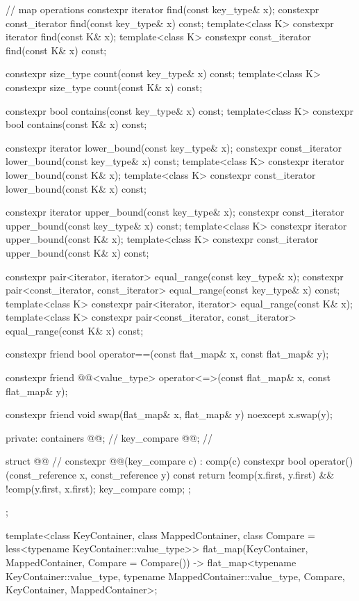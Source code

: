 \begin{codeblock}
{{    // map operations
    constexpr iterator find(const key_type& x);
    constexpr const_iterator find(const key_type& x) const;
    template<class K> constexpr iterator find(const K& x);
    template<class K> constexpr const_iterator find(const K& x) const;

    constexpr size_type count(const key_type& x) const;
    template<class K> constexpr size_type count(const K& x) const;

    constexpr bool contains(const key_type& x) const;
    template<class K> constexpr bool contains(const K& x) const;

    constexpr iterator lower_bound(const key_type& x);
    constexpr const_iterator lower_bound(const key_type& x) const;
    template<class K> constexpr iterator lower_bound(const K& x);
    template<class K> constexpr const_iterator lower_bound(const K& x) const;

    constexpr iterator upper_bound(const key_type& x);
    constexpr const_iterator upper_bound(const key_type& x) const;
    template<class K> constexpr iterator upper_bound(const K& x);
    template<class K> constexpr const_iterator upper_bound(const K& x) const;

    constexpr pair<iterator, iterator> equal_range(const key_type& x);
    constexpr pair<const_iterator, const_iterator> equal_range(const key_type& x) const;
    template<class K> constexpr pair<iterator, iterator> equal_range(const K& x);
    template<class K>
      constexpr pair<const_iterator, const_iterator> equal_range(const K& x) const;

    constexpr friend bool operator==(const flat_map& x, const flat_map& y);

    constexpr friend @@<value_type>
      operator<=>(const flat_map& x, const flat_map& y);

    constexpr friend void swap(flat_map& x, flat_map& y) noexcept
      { x.swap(y); }

  private:
    containers @@;               // \expos
    key_compare @@;        // \expos

    struct @@ {  // \expos
      constexpr @@(key_compare c) : comp(c) { }
      constexpr bool operator()(const_reference x, const_reference y) const {
        return !comp(x.first, y.first) && !comp(y.first, x.first);
      }
      key_compare comp;
    };
  };

  template<class KeyContainer, class MappedContainer,
           class Compare = less<typename KeyContainer::value_type>>
    flat_map(KeyContainer, MappedContainer, Compare = Compare())
      -> flat_map<typename KeyContainer::value_type, typename MappedContainer::value_type,
                  Compare, KeyContainer, MappedContainer>;

}
\end{codeblock}
